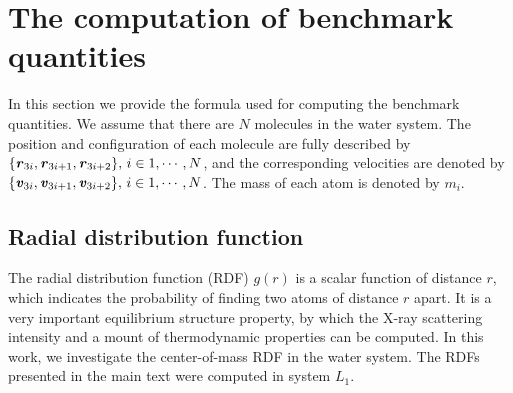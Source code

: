 \documentclass[aip,jcp,a4paper,preprint,unsortedaddress,onecolumn,fleqn]{revtex4-1}
\newcommand{\vect}[1]{\textbf{\textit{#1}}}
\newcommand{\systemlb}{L_1}
\begin{document}


\appendix

\section{The computation of benchmark quantities}
\label{appendix:benchmark}

In this section we provide the formula used for computing the benchmark quantities. We assume that there are
$N$ molecules in the water system. The position and configuration of each molecule are fully described
by $\{\vect r_{3i},\vect r_{3i+1}, \vect r_{3i+2}\},\, i\in 1,\cdots,N$, and the corresponding velocities
are denoted by $\{\vect v_{3i},\vect v_{3i+1}, \vect v_{3i+2}\},\, i\in 1,\cdots,N$. The mass of each
atom is denoted by $m_i$.

\subsection{Radial distribution function}
The radial distribution function (RDF) $g(r)$ is a scalar function of distance $r$, which indicates the
probability of finding two atoms of distance $r$ apart.  It is a very
important equilibrium structure property, by which the X-ray scattering
intensity and a mount of thermodynamic properties can be computed.
In this work, we investigate the center-of-mass RDF in the water
system. The RDFs presented in the main text were computed in system $\systemlb$.

\end{document}
